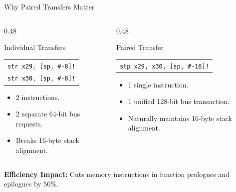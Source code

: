 \documentclass[aspectratio=169,11pt,t]{beamer}
\newcommand{\key}[1]{\textbf{#1}}
\newcommand{\code}[1]{\texttt{#1}}
\begin{document}
\begin{frame}{Why Paired Transfers Matter}
\begin{columns}[T,onlytextwidth]
\begin{column}{0.48\textwidth}
\begin{block}{Individual Transfers}
\small
\begin{tabular}{l}
\code{str x29, [sp, \#-8]!} \\
\code{str x30, [sp, \#-8]!} \\
\end{tabular}
\vspace{0.15cm}
\begin{itemize}\setlength{\itemsep}{2pt}
  \item 2 instructions.
  \item 2 separate 64-bit bus requests.
  \item Breaks 16-byte stack alignment.
\end{itemize}
\end{block}
\end{column}

\begin{column}{0.48\textwidth}
\begin{block}{Paired Transfer}
\small
\begin{tabular}{l}
\code{stp x29, x30, [sp, \#-16]!} \\
\end{tabular}
\vspace{0.15cm}
\begin{itemize}\setlength{\itemsep}{2pt}
  \item 1 single instruction.
  \item 1 unified 128-bit bus transaction.
  \item Naturally maintains 16-byte stack alignment.
\end{itemize}
\end{block}
\end{column}
\end{columns}

\vspace{0.35cm}
\normalsize
\key{Efficiency Impact:} Cuts memory instructions in function prologues and epilogues by $50\%$.
\end{frame}

\end{document}
